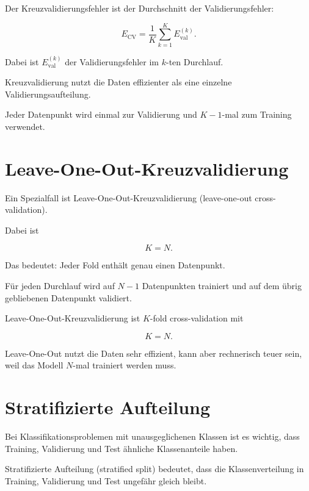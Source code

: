 Der Kreuzvalidierungsfehler ist der Durchschnitt der Validierungsfehler:

\[
    E_{\mathrm{CV}}
    =
    \frac{1}{K}
    \sum_{k=1}^{K}
    E_{\mathrm{val}}^{(k)}.
\]

Dabei ist \(E_{\mathrm{val}}^{(k)}\) der Validierungsfehler im \(k\)-ten Durchlauf.

\begin{conceptbox}
Kreuzvalidierung nutzt die Daten effizienter als eine einzelne Validierungsaufteilung.

Jeder Datenpunkt wird einmal zur Validierung und \(K-1\)-mal zum Training verwendet.
\end{conceptbox}

\section{Leave-One-Out-Kreuzvalidierung}

Ein Spezialfall ist Leave-One-Out-Kreuzvalidierung (leave-one-out cross-validation).

Dabei ist

\[
    K=N.
\]

Das bedeutet:
Jeder Fold enthält genau einen Datenpunkt.

Für jeden Durchlauf wird auf \(N-1\) Datenpunkten trainiert und auf dem übrig gebliebenen Datenpunkt validiert.

\begin{definitionbox}
Leave-One-Out-Kreuzvalidierung ist \(K\)-fold cross-validation mit

\[
    K=N.
\]
\end{definitionbox}

\begin{notebox}
Leave-One-Out nutzt die Daten sehr effizient, kann aber rechnerisch teuer sein, weil das Modell \(N\)-mal trainiert werden muss.
\end{notebox}

\section{Stratifizierte Aufteilung}

Bei Klassifikationsproblemen mit unausgeglichenen Klassen ist es wichtig, dass Training, Validierung und Test ähnliche Klassenanteile haben.

\begin{definitionbox}
Stratifizierte Aufteilung (stratified split) bedeutet, dass die Klassenverteilung in Training, Validierung und Test ungefähr gleich bleibt.
\end{definitionbox}

